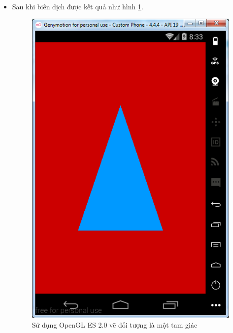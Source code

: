 \documentclass[13pt,a4paper]{extreport}
\begin{document}
\begin{itemize}
		\newpage
		\item Sau khi biên dịch được kết quả như hình \ref{Fig:opengles-2}.
				\begin{figure}[!h]
					\begin{center}
						\includegraphics[scale=.6]{images/opengles-2.png}
					\end{center}
					\caption{Sử dụng OpenGL ES 2.0 vẽ đối tượng là một tam giác} \label{Fig:opengles-2}
				\end{figure}						
	\end{itemize}
\end{document}
